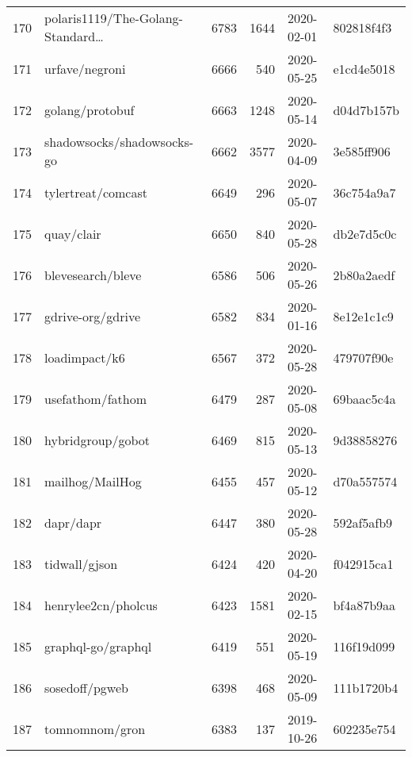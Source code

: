 \begin{longtable}{llrrll}
    170 &              polaris1119/The-Golang-Standard\ldots &   6783 &   1644 & 2020-02-01 &  802818f4f3 \\
    171 &                                     urfave/negroni &   6666 &    540 & 2020-05-25 &  e1cd4e5018 \\
    172 &                                    golang/protobuf &   6663 &   1248 & 2020-05-14 &  d04d7b157b \\
    173 &                         shadowsocks/shadowsocks-go &   6662 &   3577 & 2020-04-09 &  3e585ff906 \\
    174 &                                 tylertreat/comcast &   6649 &    296 & 2020-05-07 &  36c754a9a7 \\
    175 &                                         quay/clair &   6650 &    840 & 2020-05-28 &  db2e7d5c0c \\
    176 &                                  blevesearch/bleve &   6586 &    506 & 2020-05-26 &  2b80a2aedf \\
    177 &                                  gdrive-org/gdrive &   6582 &    834 & 2020-01-16 &  8e12e1c1c9 \\
    178 &                                      loadimpact/k6 &   6567 &    372 & 2020-05-28 &  479707f90e \\
    179 &                                   usefathom/fathom &   6479 &    287 & 2020-05-08 &  69baac5c4a \\
    180 &                                  hybridgroup/gobot &   6469 &    815 & 2020-05-13 &  9d38858276 \\
    181 &                                    mailhog/MailHog &   6455 &    457 & 2020-05-12 &  d70a557574 \\
    182 &                                          dapr/dapr &   6447 &    380 & 2020-05-28 &  592af5afb9 \\
    183 &                                      tidwall/gjson &   6424 &    420 & 2020-04-20 &  f042915ca1 \\
    184 &                                henrylee2cn/pholcus &   6423 &   1581 & 2020-02-15 &  bf4a87b9aa \\
    185 &                                 graphql-go/graphql &   6419 &    551 & 2020-05-19 &  116f19d099 \\
    186 &                                     sosedoff/pgweb &   6398 &    468 & 2020-05-09 &  111b1720b4 \\
    187 &                                     tomnomnom/gron &   6383 &    137 & 2019-10-26 &  602235e754 \\

\end{longtable}
